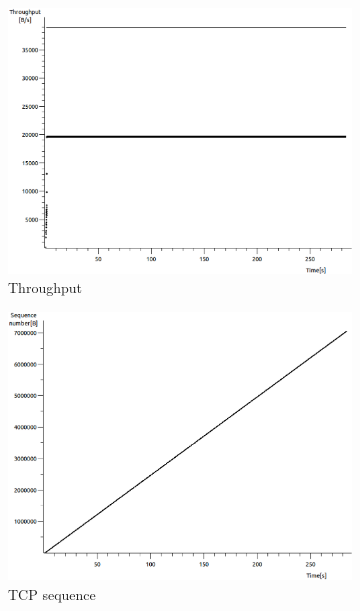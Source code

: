 \documentclass[conference,a4paper]{../../sty/IEEEtran}
\begin{document}
\begin{figure}
 \centering
 \begin{subfigure}[b]{0.2\textwidth}
  \includegraphics[width=\textwidth]{s1-1_thru}
  \caption{Throughput}
 \end{subfigure}
 \begin{subfigure}[b]{0.2\textwidth}
  \includegraphics[width=\textwidth]{s1-1_seq}
  \caption{TCP sequence}
 \end{subfigure}
 \begin{subfigure}[b]{0.2\textwidth}

\end{subfigure}
\end{figure}
\end{document}
